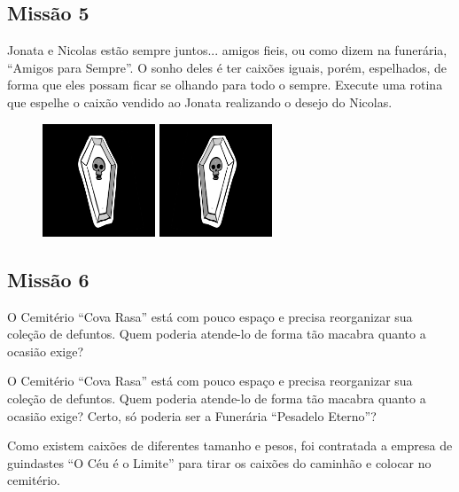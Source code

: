 \documentclass[
	12pt,				%
	oneside,			%
	a4paper,			%
	english,			%
	french,				%
	spanish,			%
	brazil,				%
	]{abntex2}
\begin{document}
\begin{apendicesenv}
\subsection{Missão 5}

Jonata e Nicolas estão sempre juntos... amigos fieis, ou como dizem na funerária, “Amigos para Sempre”. O sonho deles é ter caixões iguais, porém, espelhados, de forma que eles possam ficar se olhando para todo o sempre. Execute uma rotina que espelhe o caixão vendido ao Jonata realizando o desejo do Nicolas.

\begin{figure}[ht]
\centering
\includegraphics[width=0.3\textwidth]{imagens/desafios/conffin3d.jpg}
\includegraphics[width=0.3\textwidth]{imagens/desafios/mission5.png}
\end{figure}

\subsection{Missão 6}

O Cemitério “Cova Rasa” está com pouco espaço e precisa reorganizar sua coleção de defuntos. Quem poderia atende-lo de forma tão macabra quanto a ocasião exige?

O Cemitério “Cova Rasa” está com pouco espaço e precisa reorganizar sua coleção de defuntos. Quem poderia atende-lo de forma tão macabra quanto a ocasião exige? Certo, só poderia ser a Funerária “Pesadelo Eterno”?

Como existem caixões de diferentes tamanho e pesos, foi contratada a empresa de guindastes “O Céu é o Limite” para tirar os caixões do caminhão e colocar no cemitério.


\end{apendicesenv}
\end{document}
